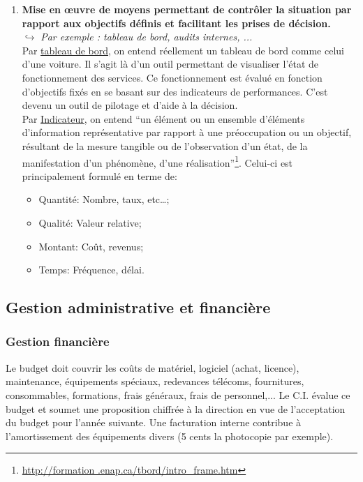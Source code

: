 \documentclass[10pt,a4paper,oneside,titlepage]{report}
\newcommand{\titre}[1]{\textcolor{title}{#1}}
\newcommand{\newterm}[1]{\textit{#1}}
\newcommand{\strong}[1]{\textbf{\titre{#1}}}
\begin{document}
\begin{enumerate}
\item \strong{Mise en \oe uvre de moyens permettant de contrôler la situation
par rapport aux objectifs définis et facilitant les prises de décision.} \\
$\hookrightarrow$ \newterm{Par exemple : tableau de bord, audits internes, ...
} \\
Par \underline{tableau de bord}, on entend réellement un tableau de bord comme
celui d'une voiture. Il s'agit là d'un outil permettant de visualiser l'état de
fonctionnement des services. Ce fonctionnement est évalué en fonction
d'objectifs fixés en se basant sur des indicateurs de performances. C'est devenu
un outil de pilotage et d'aide à la décision.\\

Par \underline{Indicateur}, on entend ``un élément ou un ensemble d’éléments
d’information représentative par rapport à une préoccupation ou un objectif,
résultant de la mesure tangible ou de l’observation d’un état, de la
manifestation d’un phénomène, d’une réalisation''\footnote{\url{http://formation
.enap.ca/tbord/intro_frame.htm}}. Celui-ci est principalement formulé en terme
de:
\begin{itemize}
\item Quantité: Nombre, taux, etc\dots;
\item Qualité: Valeur relative;
\item Montant: Coût, revenus;
\item Temps: Fréquence, délai.
\end{itemize}
\end{enumerate}

\subsection{Gestion administrative et financière}

\subsubsection{Gestion financière}

Le budget doit couvrir les coûts de matériel, logiciel (achat, licence), maintenance, équipements spéciaux, redevances télécoms, fournitures, consommables, formations,
frais généraux, frais de personnel,... Le C.I. évalue ce budget et soumet une proposition chiffrée à la direction en vue de l'acceptation du budget pour l'année suivante.
Une facturation interne contribue à l'amortissement des équipements divers (5 cents la photocopie par exemple).
\end{document}
